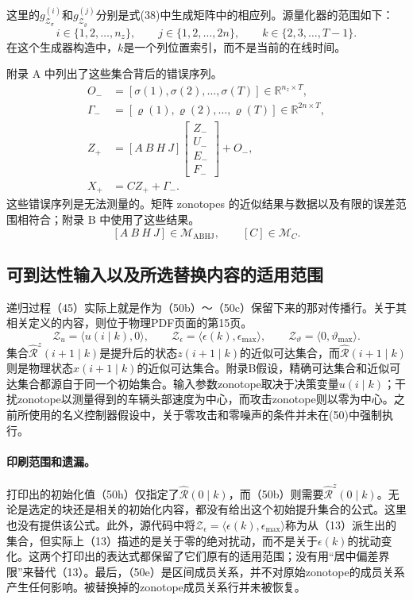 \documentclass{article}
\begin{document}
这里的$g_{\mathcal{Z}_{\sigma}}^{(i)}$和$g_{\mathcal{Z}_{\varrho}}^{(j)}$分别是式(38)中生成矩阵中的相应列。源量化器的范围如下：
\[
i\in\{1,2,\ldots,n_z\},\qquad j\in\{1,2,\ldots,2n\},\qquad k\in\{2,3,\ldots,T-1\}.
\]
在这个生成器构造中，$k$是一个列位置索引，而不是当前的在线时间。

附录 A 中列出了这些集合背后的错误序列。
\begin{align}
O_-&=[\sigma(1),\sigma(2),\ldots,\sigma(T)]\in\mathbb{R}^{n_z\times T}, \tag{A.1}\\
\Gamma_-&=[\varrho(1),\varrho(2),\ldots,\varrho(T)]\in\mathbb{R}^{2n\times T}, \tag{A.2}\\
Z_+&=[A\ B\ H\ J]\begin{bmatrix}Z_-\\U_-\\E_-\\F_-\end{bmatrix}+O_-, \tag{A.3}\\
X_+&=CZ_++\Gamma_-. \tag{A.4}
\end{align}
这些错误序列是无法测量的。矩阵 zonotopes 的近似结果与数据以及有限的误差范围相符合；附录 B 中使用了这些结果。
\[
[A\ B\ H\ J]\in\mathcal{M}_{\mathrm{ABHJ}},\qquad [C]\in\mathcal{M}_C.
\]

\subsection*{可到达性输入以及所选替换内容的适用范围}
递归过程（45）实际上就是作为（50b）～（50c）保留下来的那对传播行。关于其相关定义的内容，则位于物理PDF页面的第15页。
\[
\mathcal{Z}_u=\langle u(i\mid k),0\rangle,\qquad
\mathcal{Z}_{\epsilon}=\langle\epsilon(k),\epsilon_{\max}\rangle,\qquad
\mathcal{Z}_{\vartheta}=\langle0,\vartheta_{\max}\rangle.
\]
集合$\hat{\mathcal{R}}^z(i+1\mid k)$是提升后的状态$z(i+1\mid k)$的近似可达集合，而$\hat{\mathcal{R}}(i+1\mid k)$则是物理状态$x(i+1\mid k)$的近似可达集合。附录B假设，精确可达集合和近似可达集合都源自于同一个初始集合。输入参数zonotope取决于决策变量$u(i\mid k)$；干扰zonotope以测量得到的车辆头部速度为中心，而攻击zonotope则以零为中心。之前所使用的名义控制器假设中，关于零攻击和零噪声的条件并未在(50)中强制执行。

\paragraph{印刷范围和遗漏。}
打印出的初始化值（50h）仅指定了$\hat{\mathcal{R}}(0\mid k)$，而（50b）则需要$\hat{\mathcal{R}}^z(0\mid k)$。无论是选定的块还是相关的初始化内容，都没有给出这个初始提升集合的公式。这里也没有提供该公式。此外，源代码中将$\mathcal{Z}_{\epsilon}=\langle\epsilon(k),\epsilon_{\max}\rangle$称为从（13）派生出的集合，但实际上（13）描述的是关于零的绝对扰动，而不是关于$\epsilon(k)$的扰动变化。这两个打印出的表达式都保留了它们原有的适用范围；没有用“居中偏差界限”来替代（13）。最后，（50e）是区间成员关系，并不对原始zonotope的成员关系产生任何影响。被替换掉的zonotope成员关系行并未被恢复。
\end{document}
